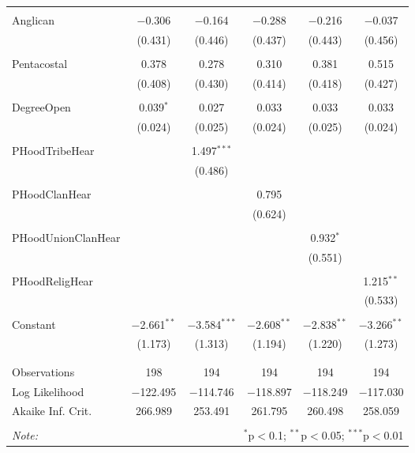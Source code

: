 \begin{table}[!htbp]
\begin{tabular}{@{\extracolsep{5pt}}lccccc}
  & & & & & \\ 
 Anglican & $-$0.306 & $-$0.164 & $-$0.288 & $-$0.216 & $-$0.037 \\ 
  & (0.431) & (0.446) & (0.437) & (0.443) & (0.456) \\ 
  & & & & & \\ 
 Pentacostal & 0.378 & 0.278 & 0.310 & 0.381 & 0.515 \\ 
  & (0.408) & (0.430) & (0.414) & (0.418) & (0.427) \\ 
  & & & & & \\ 
 DegreeOpen & 0.039$^{*}$ & 0.027 & 0.033 & 0.033 & 0.033 \\ 
  & (0.024) & (0.025) & (0.024) & (0.025) & (0.024) \\ 
  & & & & & \\ 
 PHoodTribeHear &  & 1.497$^{***}$ &  &  &  \\ 
  &  & (0.486) &  &  &  \\ 
  & & & & & \\ 
 PHoodClanHear &  &  & 0.795 &  &  \\ 
  &  &  & (0.624) &  &  \\ 
  & & & & & \\ 
 PHoodUnionClanHear &  &  &  & 0.932$^{*}$ &  \\ 
  &  &  &  & (0.551) &  \\ 
  & & & & & \\ 
 PHoodReligHear &  &  &  &  & 1.215$^{**}$ \\ 
  &  &  &  &  & (0.533) \\ 
  & & & & & \\ 
 Constant & $-$2.661$^{**}$ & $-$3.584$^{***}$ & $-$2.608$^{**}$ & $-$2.838$^{**}$ & $-$3.266$^{**}$ \\ 
  & (1.173) & (1.313) & (1.194) & (1.220) & (1.273) \\ 
  & & & & & \\ 
\hline \\[-1.8ex] 
Observations & 198 & 194 & 194 & 194 & 194 \\ 
Log Likelihood & $-$122.495 & $-$114.746 & $-$118.897 & $-$118.249 & $-$117.030 \\ 
Akaike Inf. Crit. & 266.989 & 253.491 & 261.795 & 260.498 & 258.059 \\ 
\hline 
\hline \\[-1.8ex] 
\textit{Note:}  & \multicolumn{5}{r}{$^{*}$p$<$0.1; $^{**}$p$<$0.05; $^{***}$p$<$0.01} \\ 
\end{tabular} 
\end{table} 
